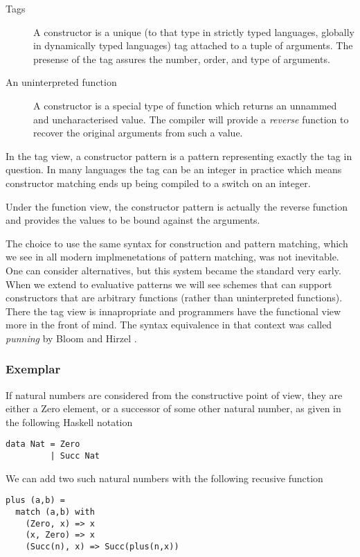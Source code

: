 \documentclass[acmsmall]{acmart}
\begin{document}
\begin{description}
  \item[Tags] A constructor is a unique (to that type in strictly typed languages, globally in dynamically typed languages) tag attached to a tuple of arguments.  The presense of the tag assures the number, order, and type of arguments.
  \item[An uninterpreted function] A constructor is a special type of function which returns an unnammed and uncharacterised value.  The compiler will provide a \emph{reverse} function to recover the original arguments from such a value.
\end{description}
In the tag view, a constructor pattern is a pattern representing exactly the tag in question.  In many languages the tag can be an integer in practice which means constructor matching ends up being compiled to a switch on an integer.  

Under the function view, the constructor pattern is actually the reverse function and provides the values to be bound against the arguments.

The choice to use the same syntax for construction and pattern matching, which we see in all modern implmenetations of pattern matching, was not inevitable.  One can consider alternatives, but this system became the standard very early.  When we extend to evaluative patterns we will see schemes that can support constructors that are arbitrary functions (rather than uninterpreted functions).  There the tag view is innapropriate and programmers have the functional view more in the front of mind.  The syntax equivalence in that context was called \emph{punning} by Bloom and Hirzel \cite{bloom_robust_2013}.

\subsubsection{Exemplar}
If natural numbers are considered from the constructive point of view, they are either a Zero element, or a successor of some other natural number, as given in the following Haskell notation
\begin{lstlisting}
data Nat = Zero 
         | Succ Nat
\end{lstlisting}

We can add two such natural numbers with the following recusive function
\begin{lstlisting}
plus (a,b) = 
  match (a,b) with
    (Zero, x) => x
    (x, Zero) => x
    (Succ(n), x) => Succ(plus(n,x))
\end{lstlisting}
\end{document}
